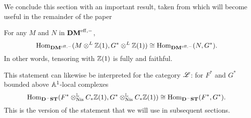 We conclude this section with an important result, taken from
\cite[Corollary 4.10]{V02} which will become useful in the 
remainder of the paper

\begin{thm}[Cancellation]\label{thm_dm_cancellation}
For any $M$ and $N$ in $\mathbf{DM}^{\mathrm{eff},-}$,
\[
\mathrm{Hom}_{\mathbf{DM}^{\mathrm{eff},-}}(M \otimes^L \mathbb{Z}(1), G^* \otimes^L \mathbb{Z}(1)) \cong
   \mathrm{Hom}_{\mathbf{DM}^{\mathrm{eff},-}}(N, G^*).
\]
In other words, tensoring with $\mathbb{Z}(1)$ is fully and faithful.
\end{thm}

This statement can likewise be interpreted for the category 
$\mathscr{L}$: for $F^*$ and $G^*$ bounded above $\mathbb{A}^1$-local 
complexes
\[
\mathrm{Hom}_{\mathbf{D}^-\mathbf{ST}}(F^* \otimes^{\mathbb{L}}_{\mathrm{Nis}} C_{*} \mathbb{Z}(1), G^* \otimes^{\mathbb{L}}_{\mathrm{Nis}} C_{*} \mathbb{Z}(1))
\cong \mathrm{Hom}_{\mathbf{D}^-\mathbf{ST}}(F^*, G^*).
\]
This is the version of the statement that we will use in
subsequent sections.
